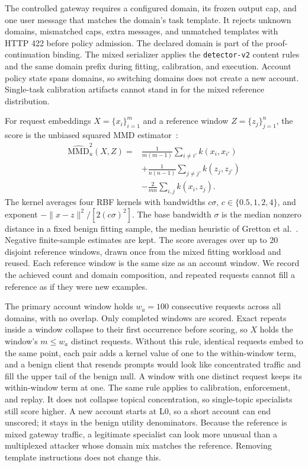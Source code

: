 \documentclass[journal]{IEEEtran}
\begin{document}
The controlled gateway requires a configured domain, its frozen output cap, and one user message that matches the domain's task template. It rejects unknown domains, mismatched caps, extra messages, and unmatched templates with HTTP 422 before policy admission. The declared domain is part of the proof-continuation binding. The mixed serializer applies the \texttt{detector-v2} content rules and the same domain prefix during fitting, calibration, and execution. Account policy state spans domains, so switching domains does not create a new account. Single-task calibration artifacts cannot stand in for the mixed reference distribution.

For request embeddings $X=\{x_i\}_{i=1}^{m}$ and a reference window $Z=\{z_j\}_{j=1}^{n}$, the score is the unbiased squared MMD estimator~\cite{gretton2012kernel}:
\begin{align}
\widehat{\mathrm{MMD}}_u^2(X,Z)
={}&\frac{1}{m(m-1)}\sum_{i\ne i'}k(x_i,x_{i'})\nonumber\\
	&+\frac{1}{n(n-1)}\sum_{j\ne j'}k(z_j,z_{j'})\nonumber\\
	&-\frac{2}{mn}\sum_{i,j}k(x_i,z_j).
\label{eq:mmd}
\end{align}
The kernel averages four RBF kernels with bandwidths $c\sigma$, $c\in\{0.5,1,2,4\}$, and exponent $-\|x-z\|^2/[2(c\sigma)^2]$. The base bandwidth $\sigma$ is the median nonzero distance in a fixed benign fitting sample, the median heuristic of Gretton et al.~\cite{gretton2012kernel}. Negative finite-sample estimates are kept. The score averages over up to 20 disjoint reference windows, drawn once from the mixed fitting workload and reused. Each reference window is the same size as an account window. We record the achieved count and domain composition, and repeated requests cannot fill a reference as if they were new examples.

The primary account window holds $w_a=100$ consecutive requests across all domains, with no overlap. Only completed windows are scored. Exact repeats inside a window collapse to their first occurrence before scoring, so $X$ holds the window's $m\leq w_a$ distinct requests. Without this rule, identical requests embed to the same point, each pair adds a kernel value of one to the within-window term, and a benign client that resends prompts would look like concentrated traffic and fill the upper tail of the benign null. A window with one distinct request keeps its within-window term at one. The same rule applies to calibration, enforcement, and replay. It does not collapse topical concentration, so single-topic specialists still score higher. A new account starts at L0, so a short account can end unscored; it stays in the benign utility denominators. Because the reference is mixed gateway traffic, a legitimate specialist can look more unusual than a multiplexed attacker whose domain mix matches the reference. Removing template instructions does not change this.
\end{document}
